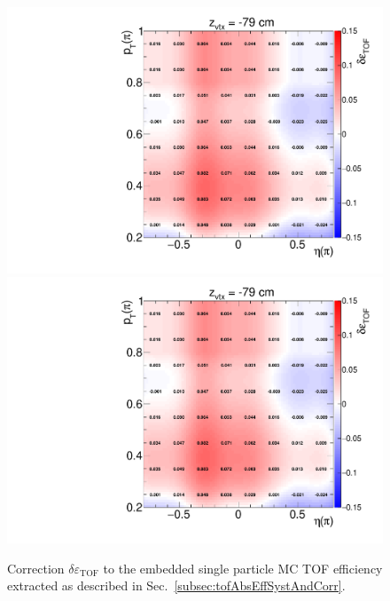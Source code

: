\begin{figure}%
	\caption[Correction $\delta\varepsilon_{\text{TOF}}$ to the embedded single particle MC TOF efficiency.]{Correction $\delta\varepsilon_{\text{TOF}}$ to the embedded single particle MC TOF efficiency extracted as described in Sec.~\ref{subsec:tofAbsEffSystAndCorr}. %
	}\label{fig:tofEffCorrection}
	\centering
	\parbox{0.325\textwidth}{
		\centering
		\includegraphics[width=\linewidth,page=1]{graphics/systematicsEfficiency/TOF_tagAndProbe/correction/TofEffCorrection3D_pion.pdf}\\
		\includegraphics[width=\linewidth,page=15]{graphics/systematicsEfficiency/TOF_tagAndProbe/correction/TofEffCorrection3D_pion.pdf}\\
}
\end{figure}
